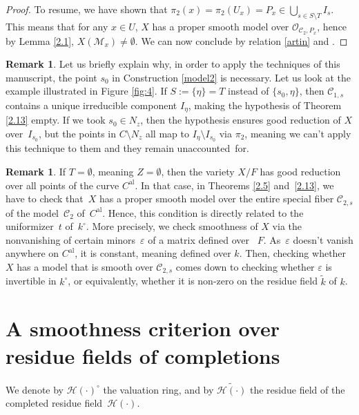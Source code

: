 \documentclass[10pt]{amsart}
\newcommand{\al}{\mathrm{al}}
\let\backslash\setminus
\let\epsilon\varepsilon
\theoremstyle{definition}
\newtheorem{rem}[thm]{Remark}
\begin{document}
\begin{proof}
To resume, we have shown that $\pi_2(x)=\pi_2(U_x)=P_x \in \bigcup_{s \in S \backslash T} I_s$. This means that for any $x \in U$, $X$ has a proper smooth model over $\mathcal{O}_{\mathscr{C}_2, P_x}$, hence by Lemma \ref{2.1}, $X(\mathscr{M}_x) \neq \emptyset$. We can now conclude by relation \eqref{artin} and \cite[Cor.\,3.18]{une}.
\end{proof}

\begin{rem}\label{2.14}
Let us briefly explain why, in order to apply the techniques of this manuscript, the point $s_0$ in Construction \ref{model2} is necessary. Let us look at the example illustrated in Figure \ref{fig:4}. If $S:=\{\eta\}=T$ instead of $\{s_0, \eta\}$, then $\mathscr{C}_{1,s}$ contains a unique irreducible component $I_{\eta}$, making the hypothesis of Theorem \ref{2.13} empty. If we took $s_0 \in N_{z}$, then the hypothesis ensures good reduction of $X$ over~$I_{s_0}$, but the points in $C \backslash N_z$ all map to $I_{\eta} \backslash I_{s_0}$ via $\pi_2$, meaning we can't apply this technique to them and they remain unaccounted~for.
\end{rem}

\begin{rem} \label{2.17}
If $T=\emptyset$, meaning $Z=\emptyset$, then the variety $X/F$ has good reduction over all points of the curve $C^{\al}$. In that case, in Theorems \ref{2.5} and~\ref{2.13}, we have to check that~$X$ has a proper smooth model over the entire special fiber $\mathscr{C}_{2,s}$ of the model~$\mathscr{C}_2$ of~$C^{\al}$. Hence, this condition is directly related to the uniformizer~$t$ of~$k^{\circ}$. More precisely, we check smoothness of $X$ via the nonvanishing of certain minors~$\epsilon$ of a matrix defined over ~$F$. As~$\epsilon$ doesn't vanish anywhere on $C^{\al}$, it is constant, meaning defined over $k$. Then, checking whether $X$ has a model that is smooth over $\mathscr{C}_{2,s}$ comes down to checking whether $\epsilon$ is invertible in $k^{\circ}$, or equivalently, whether it is non-zero on the residue field $\widetilde{k}$ of $k$.
\end{rem}

\section{A smoothness criterion over residue fields of completions} \label{seksioni3}

We denote by $\mathcal{H}(\cdot)^{\circ}$ the valuation ring, and by $\widetilde{\mathcal{H}(\cdot)}$ the residue field of the completed residue field~$\mathcal{H}(\cdot)$.
\end{document}
